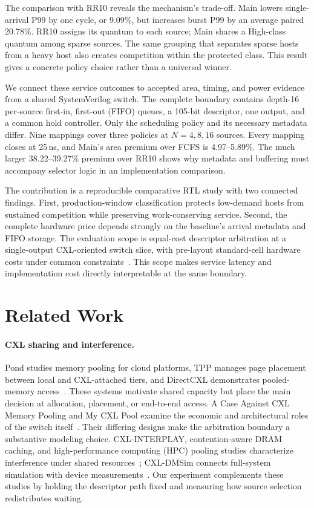 The comparison with RR10 reveals the mechanism's trade-off. Main lowers
single-arrival P99 by one cycle, or 9.09\%, but increases burst P99 by an average
paired 20.78\%. RR10 assigns its quantum to each source; Main shares a High-class
quantum among sparse sources. The same grouping that separates sparse hosts from
a heavy host also creates competition within the protected class. This result
gives a concrete policy choice rather than a universal winner.

We connect these service outcomes to accepted area, timing, and power evidence
from a shared SystemVerilog switch. The complete boundary contains depth-16
per-source first-in, first-out (FIFO) queues, a 105-bit descriptor, one output,
and a common hold controller.
Only the scheduling policy and its necessary metadata differ. Nine mappings
cover three policies at $N=4,8,16$ sources. Every mapping closes at 25\,ns, and
Main's area premium over FCFS is 4.97--5.89\%. The much larger 38.22--39.27\%
premium over RR10 shows why metadata and buffering must accompany selector logic
in an implementation comparison.

The contribution is a reproducible comparative RTL study with two connected
findings. First, production-window classification protects low-demand hosts from
sustained competition while preserving work-conserving service. Second, the
complete hardware price depends strongly on the baseline's arrival metadata and
FIFO storage. The evaluation scope is equal-cost descriptor arbitration at a
single-output CXL-oriented switch slice, with pre-layout standard-cell hardware
costs under common constraints~\cite{artifact}. This scope makes service latency
and implementation cost directly interpretable at the same boundary.

\section{Related Work}
\paragraph{CXL sharing and interference.}
Pond studies memory pooling for cloud platforms, TPP manages page placement
between local and CXL-attached tiers, and DirectCXL demonstrates pooled-memory
access~\cite{pond,tpp,directcxl}. These systems motivate shared capacity but place
the main decision at allocation, placement, or end-to-end access. A Case Against
CXL Memory Pooling and My CXL Pool examine the economic and architectural roles
of the switch itself~\cite{case_pool,my_cxl_pool}. Their differing designs make
the arbitration boundary a substantive modeling choice. CXL-INTERPLAY,
contention-aware DRAM caching, and high-performance computing (HPC) pooling studies characterize interference
under shared resources~\cite{cxl_interplay,contention_cache,hpc_pool}; CXL-DMSim
connects full-system simulation with device measurements~\cite{cxldmsim}.
Our experiment complements these studies by holding the descriptor path fixed
and measuring how source selection redistributes waiting.

